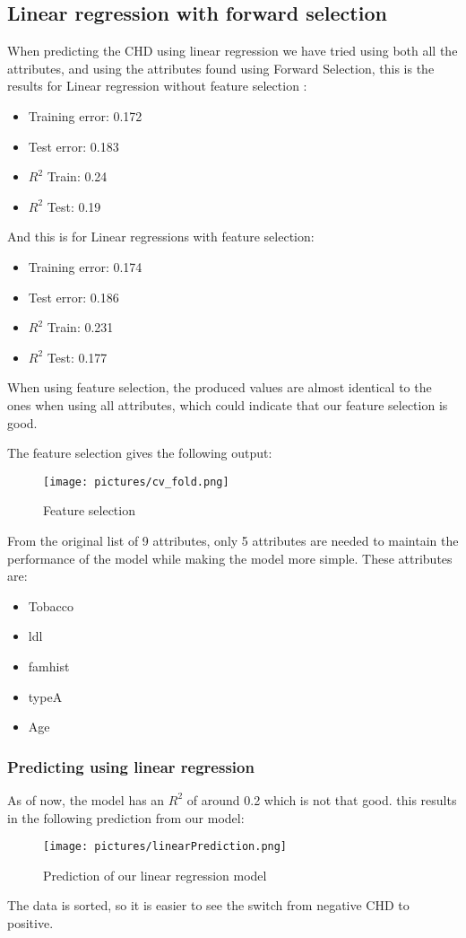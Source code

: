\subsection{Linear regression with forward selection}
\label{ForwardSelection}
When predicting the CHD using linear regression we have tried using both all the attributes, and using the attributes found using Forward Selection, this is the results for Linear regression without feature selection :
\begin{itemize}
\item Training error: 0.172
\item Test error: 0.183
\item $R^{2}$ Train: 0.24
\item $R^{2}$ Test: 0.19
\end{itemize}
And this is for Linear regressions with feature selection:
\begin{itemize}
\item Training error: 0.174
\item Test error: 0.186
\item $R^{2}$ Train: 0.231
\item $R^{2}$ Test: 0.177
\end{itemize}
When using feature selection, the produced values are almost identical to the ones when using all attributes, which could indicate that our feature selection is good.

The feature selection gives the following output:
\begin{figure}[H]
\centering
\texttt{[image: pictures/cv\_fold.png]}
\caption{Feature selection}
\label{featureSelection}
\end{figure}
From the original list of 9 attributes, only 5 attributes are needed to maintain the performance of the model while making the model more simple. These attributes are:
\begin{itemize}
\item Tobacco
\item ldl
\item famhist
\item typeA
\item Age
\end{itemize}



\subsubsection{Predicting using linear regression}
As of now, the model has an $R^{2}$ of around 0.2 which is not that good. this results in the following prediction from our model:
\begin{figure}[H]
\centering
\texttt{[image: pictures/linearPrediction.png]}
\caption{Prediction of our linear regression model}
\label{linearPrediction}
\end{figure}
The data is sorted, so it is easier to see the switch from negative CHD to positive.

